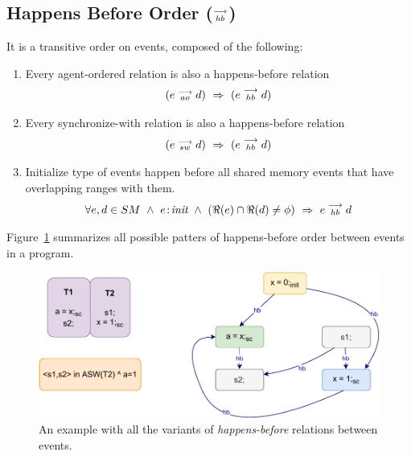     \subsection{Happens Before Order ($\stackrel{\longrightarrow}{_{hb}}$)}
        It is a transitive order on events, composed of the following:
        \begin{enumerate}
            \item Every agent-ordered relation is also a happens-before relation 
                \begin{align*}
                    (\reln{e}{ao}{d}) \ \Rightarrow{} \ (\reln{e}{hb}{d})    
                \end{align*}
                
            \item Every synchronize-with relation is also a happens-before relation 
                \begin{align*}
                    (\reln{e}{sw}{d}) \ \Rightarrow{} \ (\reln{e}{hb}{d})    
                \end{align*}
                 
            \item Initialize type of events happen before all shared memory events that have overlapping ranges with them. 
                \begin{align*}
                    \forall e,d \in SM \ \wedge \ 
                    \et{e}{init} \ \wedge \ 
                    (\Re(e) \cap \Re(d) \neq \phi)
                    \ \Rightarrow{} \ 
                    \reln{e}{hb}{d}
                \end{align*}          
        \end{enumerate}
        Figure~\ref{model:happens-before} summarizes all possible patters of happens-before order between events in a program.
        \begin{figure}[H]
            \centering
            \includegraphics[scale=0.7]{3.ECMAScriptMemoryModel/Happens-before.pdf}
            \caption{An example with all the variants of \textit{happens-before} relations between events.}
            \label{model:happens-before}
        \end{figure}
    
